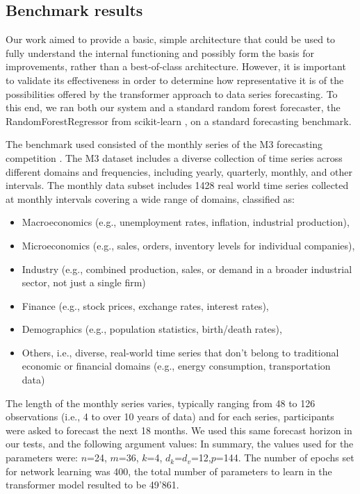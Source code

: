 \documentclass[algorithms,article,submit,pdftex,moreauthors]{Definitions/mdpi}
\begin{document}
\subsection{Benchmark results} \label{subsec:benchmark}

Our work aimed to provide a basic, simple architecture that could be used to fully understand the internal functioning and possibly form the basis for improvements, rather than a best-of-class architecture. However, it is important to validate its effectiveness in order to determine how representative it is of the possibilities offered by the transformer approach to data series forecasting. To this end, we ran both our system and a standard random forest forecaster, the RandomForestRegressor from scikit-learn \cite{GEW06}, on a standard forecasting benchmark.

The benchmark used consisted of the monthly series of the M3 forecasting competition \cite{MH00}. The M3 dataset includes a diverse collection of time series across different domains and frequencies, including yearly, quarterly, monthly, and other intervals. The monthly data subset includes 1428 real world time series collected at monthly intervals covering a wide range of domains, classified as:
\begin{itemize}
	\item Macroeconomics (e.g., unemployment rates, inflation, industrial production),
	\item Microeconomics (e.g., sales, orders, inventory levels for individual companies),
	\item Industry (e.g., combined production, sales, or demand in a broader industrial sector, not just a single firm)
	\item Finance (e.g., stock prices, exchange rates, interest rates),
	\item Demographics (e.g., population statistics, birth/death rates),
	\item Others, i.e., diverse, real-world time series that don’t belong to traditional economic or financial domains (e.g., energy consumption, transportation data)
\end{itemize}

The length of the monthly series varies, typically ranging from 48 to 126 observations (i.e., 4 to over 10 years of data) and for each series, participants were asked to forecast the next 18 months. We used this same forecast horizon in our tests, and the following argument values: In summary, the values used for the parameters were: $n$=24, $m$=36, $k$=4, $d_k$=$d_v$=12,$p$=144. The number of epochs set for network learning was 400, the total number of parameters to learn in the transformer model resulted to be 49'861.
\end{document}
